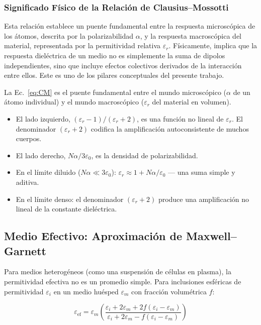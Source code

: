 \documentclass[12pt]{article}
\begin{document}
\subsubsection{Significado F\'isico de la Relaci\'on de Clausius--Mossotti}

Esta relaci\'on establece un puente fundamental entre la respuesta microsc\'opica de
los \'atomos, descrita por la polarizabilidad $\alpha$, y la respuesta macrosc\'opica del
material, representada por la permitividad relativa $\varepsilon_r$. F\'isicamente,
implica que la respuesta diel\'ectrica de un medio no es simplemente la suma de
dipolos independientes, sino que incluye efectos colectivos derivados de la interacci\'on
entre ellos. Este es uno de los pilares conceptuales del presente trabajo.

La Ec.~\eqref{eq:CM} es el puente fundamental entre el mundo microsc\'opico ($\alpha$ de un
\'atomo individual) y el mundo macrosc\'opico ($\varepsilon_r$ del material en volumen).

\begin{itemize}
\item El lado izquierdo, $(\varepsilon_r - 1)/(\varepsilon_r + 2)$, es una funci\'on no
lineal de $\varepsilon_r$. El denominador $(\varepsilon_r + 2)$ codifica la
amplificaci\'on autoconsistente de muchos cuerpos.
\item El lado derecho, $N\alpha/3\varepsilon_0$, es la densidad de polarizabilidad.
\item En el l\'imite diluido ($N\alpha \ll 3\varepsilon_0$): $\varepsilon_r \approx
1 + N\alpha/\varepsilon_0$ --- una suma simple y aditiva.
\item En el l\'imite denso: el denominador $(\varepsilon_r + 2)$ produce una amplificaci\'on
no lineal de la constante diel\'ectrica.

\end{itemize}

\subsection{Medio Efectivo: Aproximaci\'on de Maxwell--Garnett}

Para medios heterog\'eneos (como una suspensi\'on de c\'elulas en plasma), la permitividad
efectiva no es un promedio simple. Para inclusiones esf\'ericas de permitividad $\varepsilon_i$ en
un medio hu\'esped $\varepsilon_m$ con fracci\'on volum\'etrica $f$:

\begin{equation}
\varepsilon_{\text{ef}} =
\varepsilon_m\left(
\frac{\varepsilon_i + 2\varepsilon_m + 2f(\varepsilon_i - \varepsilon_m)}
{\varepsilon_i + 2\varepsilon_m - f(\varepsilon_i - \varepsilon_m)}
\right)
\label{eq:MG}
\end{equation}
\end{document}
